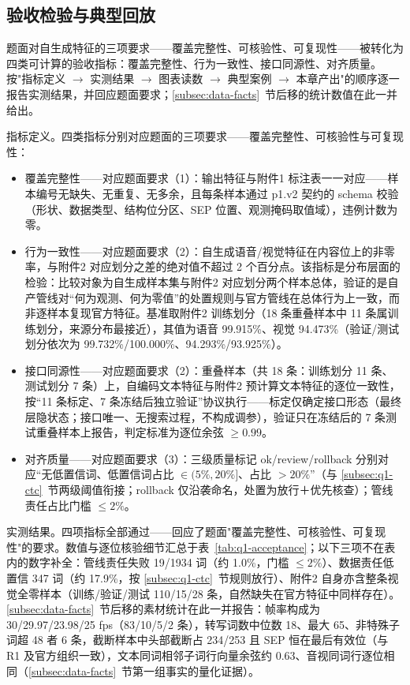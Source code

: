 \documentclass[colorprint,nocoverzero]{gmcmthesis}
\begin{document}
\subsection{验收检验与典型回放}\label{subsec:q1-accept}
题面对自生成特征的三项要求——覆盖完整性、可核验性、可复现性——被转化为四类可计算的验收指标：覆盖完整性、行为一致性、接口同源性、对齐质量。按"指标定义 $\to$ 实测结果 $\to$ 图表读数 $\to$ 典型案例 $\to$ 本章产出"的顺序逐一报告实测结果，并回应题面要求；\ref{subsec:data-facts}~节后移的统计数值在此一并给出。

指标定义。四类指标分别对应题面的三项要求——覆盖完整性、可核验性与可复现性：
\begin{itemize}
  \item 覆盖完整性——对应题面要求（1）：输出特征与附件1 标注表一一对应——样本编号无缺失、无重复、无多余，且每条样本通过 p1.v2 契约的 schema 校验（形状、数据类型、结构位分区、SEP 位置、观测掩码取值域），违例计数为零。
  \item 行为一致性——对应题面要求（2）：自生成语音/视觉特征在内容位上的非零率，与附件2 对应划分之差的绝对值不超过 2 个百分点。该指标是分布层面的检验：比较对象为自生成样本集与附件2 对应划分两个样本总体，验证的是自产管线对``何为观测、何为零值''的处置规则与官方管线在总体行为上一致，而非逐样本复现官方特征。基准取附件2 训练划分（18 条重叠样本中 11 条属训练划分，来源分布最接近），其值为语音 99.915\%、视觉 94.473\%（验证/测试划分依次为 99.732\%/100.000\%、94.293\%/93.925\%）。
  \item 接口同源性——对应题面要求（2）：重叠样本（共 18 条：训练划分 11 条、测试划分 7 条）上，自编码文本特征与附件2 预计算文本特征的逐位一致性，按``11 条标定、7 条冻结后独立验证''协议执行——标定仅确定接口形态（最终层隐状态；接口唯一、无搜索过程，不构成调参），验证只在冻结后的 7 条测试重叠样本上报告，判定标准为逐位余弦 $\ge 0.99$。
  \item 对齐质量——对应题面要求（3）：三级质量标记 ok/review/rollback 分别对应``无低置信词、低置信词占比 $\in(5\%,20\%]$、占比 $>20\%$''（与 \ref{subsec:q1-ctc}~节两级阈值衔接；rollback 仅沿袭命名，处置为放行＋优先核查）；管线责任占比门槛 $\le 2\%$。
\end{itemize}

实测结果。四项指标全部通过——回应了题面"覆盖完整性、可核验性、可复现性"的要求。数值与逐位核验细节汇总于表~\ref{tab:q1-acceptance}；以下三项不在表内的数字补全：管线责任失败 19/1934 词（约 1.0\%，门槛 $\le 2\%$）、数据责任低置信 347 词（约 17.9\%，按 \ref{subsec:q1-ctc}~节规则放行）、附件2 自身亦含整条视觉全零样本（训练/验证/测试 110/15/28 条，自然缺失在官方特征中同样存在）。\ref{subsec:data-facts}~节后移的素材统计在此一并报告：帧率构成为 30/29.97/23.98/25 fps（83/10/5/2 条），转写词数中位数 18、最大 65、非特殊子词超 48 者 6 条，截断样本中头部截断占 234/253 且 SEP 恒在最后有效位（与 R1 及官方组织一致），文本同词相邻子词行向量余弦约 0.63、音视同词行逐位相同（\ref{subsec:data-facts}~节第一组事实的量化证据）。
\end{document}
